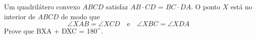 Um quadrilátero convexo $ABCD$ satisfaz $AB \cdot CD$ = $BC \cdot DA$. O ponto $X$ está no
interior de $ABCD$ de modo que
$$\angle XAB = \angle XCD \quad \mathrm{e} \quad \angle XBC = \angle XDA$$
Prove que \angle BXA + \angle DXC = 180^\circ.